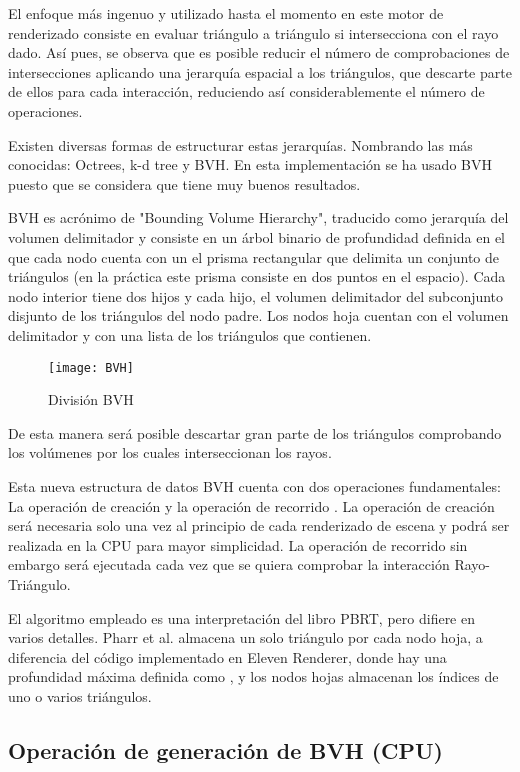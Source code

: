 El enfoque más ingenuo y utilizado hasta el momento en este motor de renderizado consiste en evaluar triángulo a triángulo si intersecciona con el rayo dado. Así pues, se observa que es posible reducir el número de comprobaciones de intersecciones aplicando una jerarquía espacial a los triángulos, que descarte parte de ellos para cada interacción, reduciendo así considerablemente el número de operaciones.

Existen diversas formas de estructurar estas jerarquías. Nombrando las más conocidas: Octrees, k-d tree y BVH. En esta implementación se ha usado BVH puesto que se considera que tiene muy buenos resultados.

BVH es acrónimo de "Bounding Volume Hierarchy", traducido como jerarquía del volumen delimitador y consiste en un árbol binario de profundidad definida en el que cada nodo cuenta con un el prisma rectangular que delimita un conjunto de triángulos (en la práctica este prisma consiste en dos puntos en el espacio). Cada nodo interior tiene dos hijos y cada hijo, el volumen delimitador del subconjunto disjunto de los triángulos del nodo padre. Los nodos hoja cuentan con el volumen delimitador y con una lista de los triángulos que contienen.

\begin{figure}[H]
    \centering
	\texttt{[image: BVH]}
	\caption{División BVH}
	\label{fig:label}
\end{figure}

De esta manera será posible descartar gran parte de los triángulos comprobando los volúmenes por los cuales interseccionan los rayos.

Esta nueva estructura de datos BVH cuenta con dos operaciones fundamentales: La operación de creación  y la operación de recorrido . La operación de creación será necesaria solo una vez al principio de cada renderizado de escena y podrá ser realizada en la CPU para mayor simplicidad. La operación de recorrido sin embargo será ejecutada cada vez que se quiera comprobar la interacción Rayo-Triángulo.

El algoritmo empleado es una interpretación del libro PBRT, pero difiere en varios detalles. Pharr et al. \cite{pharr2016physically} almacena un solo triángulo por cada nodo hoja, a diferencia del código implementado en Eleven Renderer, donde hay una profundidad máxima definida como , y los nodos hojas almacenan los índices de uno o varios triángulos. 

\subsection{Operación de generación de BVH (CPU)}

